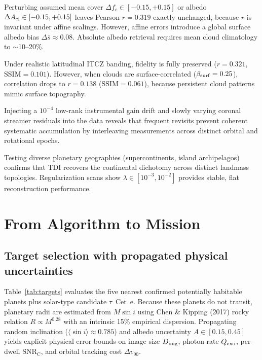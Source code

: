\documentclass[twocolumn]{emulateapj}
\begin{document}
\vspace{1mm}
 Perturbing assumed mean cover
$\Delta f_c\in[-0.15,+0.15]$ or albedo $\Delta A_{\rm cl}\in[-0.15,+0.15]$
leaves Pearson $r=0.319$ exactly unchanged, because $r$ is invariant under
affine scalings. However, affine errors introduce a global surface albedo bias
$\Delta\bar{s}\approx0.08$. Absolute albedo retrieval requires mean cloud
climatology to $\sim$10--20\%.

\vspace{1mm}
 Under realistic latitudinal ITCZ banding,
fidelity is fully preserved ($r=0.321$, $\mathrm{SSIM}=0.101$). However, when
clouds are surface-correlated ($\beta_{\rm surf}=0.25$), correlation drops to
$r=0.138$ ($\mathrm{SSIM}=0.061$), because persistent cloud patterns mimic
surface topography.

\vspace{1mm}
 Injecting a $10^{-4}$
low-rank instrumental gain drift and slowly varying coronal streamer residuals
into the data reveals that frequent revisits prevent coherent systematic accumulation
by interleaving measurements across distinct orbital and rotational epochs.

\vspace{1mm}
 Testing diverse planetary
geographies (supercontinents, island archipelagos) confirms that TDI recovers
the continental dichotomy across distinct landmass topologies. Regularization
scans show $\lambda\in[10^{-3},10^{-2}]$ provides stable, flat reconstruction
performance.

\section{From Algorithm to Mission}
\label{sec:mission}

\subsection{Target selection with propagated physical uncertainties}
\label{sec:targets}

Table~\ref{tab:targets} evaluates the five nearest confirmed potentially
habitable planets plus solar-type candidate $\tau$~Cet~e.
Because these planets do not transit, planetary radii are estimated from
$M\sin i$ using Chen \& Kipping (2017) rocky relation $R\propto M^{0.28}$
with an intrinsic 15\% empirical dispersion. Propagating random inclination
($\langle\sin i\rangle\approx0.785$) and albedo uncertainty $A\in[0.15,0.45]$
yields explicit physical error bounds on image size $D_{\rm img}$, photon rate
$Q_{\rm exo}$, per-dwell $\mathrm{SNR_C}$, and orbital tracking cost $\Delta v_{90}$.
\end{document}
